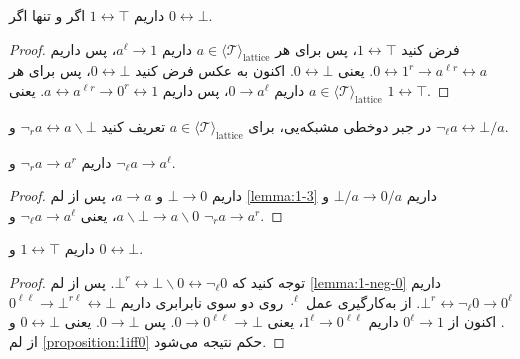 \begin{lemma}
\label{proposition:1iff0}
داریم
$1 \leftrightarrow \top$
اگر و تنها اگر
$0 \leftrightarrow \bot$.
\end{lemma}

\begin{proof}
فرض کنید 
$1 \leftrightarrow \top$،
پس برای هر 
$a \in \langle \mathcal{T} \rangle_{\mathrm{lattice}}$
داریم 
$a^\ell \rightarrow 1$،
پس داریم 
$0 \leftrightarrow 1^r \rightarrow a^{\ell r} \leftrightarrow a$.
یعنی
$0 \leftrightarrow \bot$.
اکنون به عکس فرض کنید
$0 \leftrightarrow \bot$،
پس برای هر 
$a \in \langle \mathcal{T} \rangle_{\mathrm{lattice}}$
داریم 
$0 \rightarrow a^\ell$،
پس داریم 
$a \leftrightarrow a^{\ell r} \rightarrow 0^r \leftrightarrow 1$.
یعنی
$1 \leftrightarrow \top$.
\end{proof}

\begin{definition}
در جبر دوخطی مشبکه‌یی، برای 
$a \in \langle \mathcal{T} \rangle_{\mathrm{lattice}}$
تعریف کنید
$\neg_r a \leftrightarrow a \backslash \bot$
و
$\neg_\ell a \leftrightarrow \bot / a$.
\end{definition}

\begin{lemma}
\label{lemma:1-neg-0}
داریم 
$\neg_r a \rightarrow a^r$
و
$\neg_\ell a \rightarrow a^\ell$.
\end{lemma}

\begin{proof}
داریم
$\bot \rightarrow 0$
و
$a \rightarrow a$،
پس از لم
\ref{lemma:1-3}
داریم
$\bot / a \rightarrow 0 / a$
و
$a \backslash \bot \rightarrow a \backslash 0$،
یعنی
$\neg_\ell a \rightarrow a^\ell$
و
$\neg_r a \rightarrow a^r$.
\end{proof}

\begin{theorem}
\label{theorem:4-0-bot-1-top}
داریم
$1 \leftrightarrow \top$
و
$0 \leftrightarrow \bot$.
\end{theorem}

\begin{proof}
توجه کنید که 
$\bot^r \leftrightarrow \bot \backslash 0 \leftrightarrow \neg_\ell 0$.
پس از لم
\ref{lemma:1-neg-0}
داریم
$\bot^r \leftrightarrow \neg_\ell 0 \rightarrow 0^\ell$.
از به‌کارگیری عمل
$\cdot^\ell$
روی دو سوی نابرابری داریم
$0^{\ell \ell} \rightarrow \bot^{r \ell} \leftrightarrow \bot$.
اکنون از
$0^\ell \rightarrow 1$
داریم
$1^\ell \rightarrow 0^{\ell \ell}$،
یعنی
$0 \rightarrow 0^{\ell \ell} \rightarrow \bot$.
پس 
$0 \rightarrow \bot$.
یعنی
$0 \leftrightarrow \bot$
و از لم
\ref{proposition:1iff0}
حکم نتیجه می‌شود.
\end{proof}

